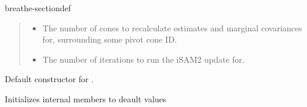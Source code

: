 \documentclass[letterpaper,10pt,english]{sphinxmanual}
\begin{document}
\begin{fulllineitems}
\begin{sphinxuseclass}{breathe-sectiondef}
\begin{fulllineitems}
\begin{quote}
\begin{description}
\begin{itemize}
\item {} 
\sphinxAtStartPar
{} \textendash{} The number of cones to recalculate estimates and marginal covariances for, surrounding some pivot cone ID.

\item {} 
\sphinxAtStartPar
{} \textendash{} The number of iterations to run the iSAM2 update for. 

\end{itemize}

\end{description}\end{quote}

\end{fulllineitems}


\begin{fulllineitems}
\label{\detokenize{isam2:_CPPv4N4slam14SLAMEstAndMCov14SLAMEstAndMCovEv}}\label{\detokenize{isam2:_CPPv3N4slam14SLAMEstAndMCov14SLAMEstAndMCovEv}}\label{\detokenize{isam2:_CPPv2N4slam14SLAMEstAndMCov14SLAMEstAndMCovEv}}\label{\detokenize{isam2:slam::SLAMEstAndMCov::SLAMEstAndMCov}}
\pysigstartsignatures
\pysigstartmultiline
\pysiglinewithargsret
{\label{\detokenize{isam2:classslam_1_1SLAMEstAndMCov_1a26b44510e1e84abf576a5129eab2cf5b}}}
{}
{}
\pysigstopmultiline
\pysigstopsignatures
\sphinxAtStartPar
Default constructor for {\hyperref[\detokenize{isam2:classslam_1_1SLAMEstAndMCov}]{}}. 

\sphinxAtStartPar
Initializes internal members to deault values 

\end{fulllineitems}



\end{sphinxuseclass}
\end{fulllineitems}
\end{document}
